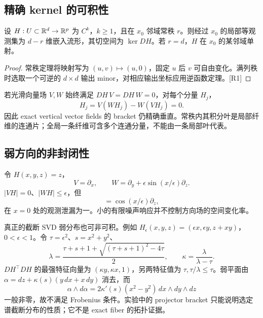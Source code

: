 \subsection{精确 kernel 的可积性}

\begin{theorem}[正则局部纤维]
设 $H:U\subset\mathbb R^d\to\mathbb R^p$ 为 $C^k$，$k\ge1$，且在 $x_0$ 邻域常秩 $r$。则经过 $x_0$ 的局部等观测集为 $d-r$ 维嵌入流形，其切空间为 $\ker DH$。若 $r=d$，$H$ 在 $x_0$ 的某邻域单射。
\end{theorem}
\begin{proof}
常秩定理将映射写为 $(u,v)\mapsto(u,0)$，固定 $u$ 后 $v$ 可自由变化。满列秩时选取一个可逆的 $d\times d$ 输出 minor，对相应输出坐标应用逆函数定理。[R1]
\end{proof}

若光滑向量场 $V,W$ 始终满足 $DH\,V=DH\,W=0$，对每个分量 $H_j$，
\begin{equation}
[V,W]H_j=V(WH_j)-W(VH_j)=0.
\end{equation}
因此 exact vertical vector fields 的 bracket 仍精确垂直。常秩内其积分叶是局部纤维的连通片；全局一条纤维可含多个连通分量，不能由一条局部叶代表。

\subsection{弱方向的非封闭性}

\begin{example}
令 $H(x,y,z)=z$，
\begin{equation}
V=\partial_x,\qquad W=\partial_y+\epsilon\sin(x/\epsilon)\partial_z.
\end{equation}
$|VH|=0$、$|WH|\le\epsilon$，但
\begin{equation}
[V,W]=\cos(x/\epsilon)\partial_z,
\end{equation}
在 $x=0$ 处的观测泄漏为一。小的有限噪声响应并不控制方向场的空间变化率。
\end{example}

真正的截断 SVD 弱分布也可非可积。例如 $H_\epsilon(x,y,z)=(\epsilon x,\epsilon y,z+xy)$，$0<\epsilon<1$。令 $\tau=\epsilon^2$、$s=x^2+y^2$、
\begin{equation}
\lambda=\frac{\tau+s+1+\sqrt{(\tau+s+1)^2-4\tau}}2,
\qquad \kappa=\frac{\lambda}{\lambda-\tau}.
\end{equation}
$DH^\top DH$ 的最强特征向量为 $(\kappa y,\kappa x,1)$，另两特征值为 $\tau,\tau/\lambda\le\tau$。弱平面由 $\alpha=dz+\kappa(s)(y\,dx+x\,dy)$ 消去，而
\begin{equation}
\alpha\wedge d\alpha=2\kappa'(s)(x^2-y^2)\,dx\wedge dy\wedge dz
\end{equation}
一般非零，故不满足 Frobenius 条件。实验中的 projector bracket 只能说明选定谱截断分布的性质；它不是 exact fiber 的拓扑证据。

